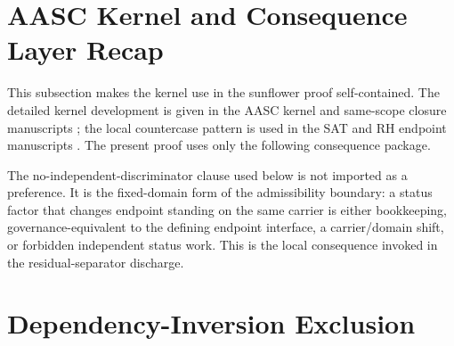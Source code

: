 \documentclass[11pt]{article}
\begin{document}
\section{AASC Kernel and Consequence Layer Recap}

This subsection makes the kernel use in the sunflower proof self-contained.  The detailed kernel development is given in the AASC kernel and same-scope closure manuscripts \cite{MaleyKernel2026,MaleyClosure2026}; the local countercase pattern is used in the SAT and RH endpoint manuscripts \cite{MaleyPNP2026,MaleyRH2026}.  The present proof uses only the following consequence package.

\begin{center}
\end{center}

The no-independent-discriminator clause used below is not imported as a preference.  It is the fixed-domain form of the admissibility boundary: a status factor that changes endpoint standing on the same carrier is either bookkeeping, governance-equivalent to the defining endpoint interface, a carrier/domain shift, or forbidden independent status work.  This is the local consequence invoked in the residual-separator discharge.

\section{Dependency-Inversion Exclusion}
\end{document}
